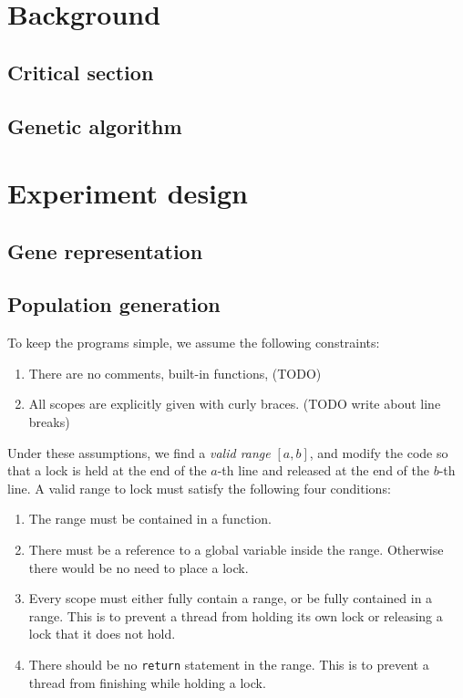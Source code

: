 \documentclass[sigconf]{acmart}
\begin{document}
\section{Background}
\subsection{Critical section}

\subsection{Genetic algorithm}

\section{Experiment design}

\subsection{Gene representation}

\subsection{Population generation}

To keep the programs simple, we assume the following constraints:

\begin{enumerate}
    \item There are no comments, built-in functions, (TODO)
    \item All scopes are explicitly given with curly braces. (TODO write about line breaks)
\end{enumerate}

Under these assumptions, we find a \textit{valid range} $[a, b]$, and modify the code so that a lock is held at the end of the $a$-th line and released at the end of the $b$-th line. A valid range to lock must satisfy the following four conditions:

\begin{enumerate}
    \item The range must be contained in a function.
    \item There must be a reference to a global variable inside the range. Otherwise there would be no need to place a lock.
    \item Every scope must either fully contain a range, or be fully contained in a range. This is to prevent a thread from holding its own lock or releasing a lock that it does not hold.
    \item There should be no \verb|return| statement in the range. This is to prevent a thread from finishing while holding a lock.
\end{enumerate}
\end{document}
